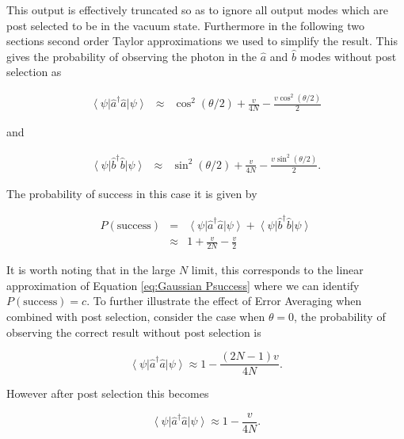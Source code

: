 \documentclass[aps,pra,twocolumn,superscriptaddress,numerical]{revtex4-1}
\begin{document}
		This output is effectively truncated so as to ignore all output modes which are post selected to be in the vacuum state. Furthermore  in the following two sections second order Taylor approximations we used to simplify the result. This gives the probability of observing the photon in the $\hat{a}$ and $\hat{b}$ modes without post selection as
		
		\begin{eqnarray}
			\left\langle \psi\right|\hat{a}^{\dagger}\hat{a}\left|\psi\right\rangle & \approx & \cos^{2}\left(\theta/2\right)+\frac{v}{4N}-\frac{v\cos^{2}(\theta/2)}{2}
		\end{eqnarray}
		
		
		and
		
		\begin{eqnarray}
			\left\langle \psi\right|\hat{b}^{\dagger}\hat{b}\left|\psi\right\rangle & \approx & \sin^{2}\left(\theta/2\right)+\frac{v}{4N}-\frac{v\sin^{2}(\theta/2)}{2}.
		\end{eqnarray}
		
		The probability of success in this case it is given by
		
		\begin{eqnarray}
			P(\textrm{success}) & = & \left\langle \psi\right|\hat{a}^{\dagger}\hat{a}\left|\psi\right\rangle +\left\langle \psi\right|\hat{b}^{\dagger}\hat{b}\left|\psi\right\rangle \\
			& \approx & 1+\frac{v}{2N}-\frac{v}{2} \label{eq:1pNarbitrary successs}
		\end{eqnarray}
		
		It is worth noting that in the large $N$ limit, this corresponds to the linear approximation of Equation \ref{eq:Gaussian Psuccess} where we can identify $P(\textrm{success})=c$. To further illustrate the effect of Error Averaging when combined with post selection, consider the case when $\theta=0$, the probability of observing the correct result without post selection is
		
		\begin{equation}
			\left\langle \psi\right|\hat{a}^{\dagger}\hat{a}\left|\psi\right\rangle \approx 1 - \frac{(2N-1)v}{4N}. \label{eq:1pNoPost}
		\end{equation}
	
		However after post selection this becomes
		
		\begin{equation}
			\left\langle \psi\right|\hat{a}^{\dagger}\hat{a}\left|\psi\right\rangle \approx 1 - \frac{v}{4N}. \label{eq:1pWithPost}
		\end{equation}
		
\end{document}
